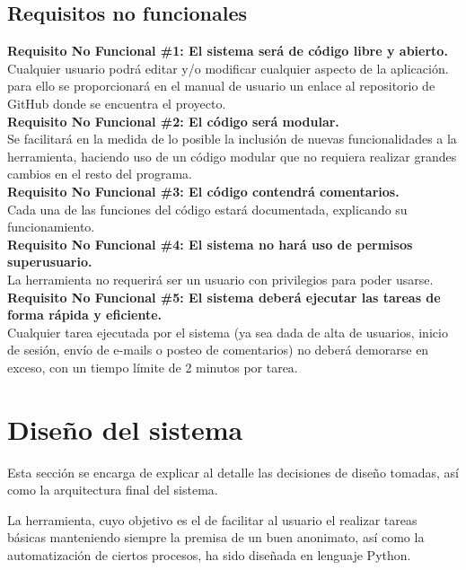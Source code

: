 \subsection{Requisitos no funcionales}
\begin{adjustwidth}{0.5cm}{}
	\textbf{Requisito No Funcional \#1: El sistema será de código libre y abierto.}\\
	Cualquier usuario podrá editar y/o modificar cualquier aspecto de la aplicación. para ello se proporcionará en el manual de usuario un enlace al repositorio de GitHub donde se encuentra el proyecto. \\
	\linebreak		
	\textbf{Requisito No Funcional \#2: El código será modular.}\\
	Se facilitará en la medida de lo posible la inclusión de nuevas funcionalidades a la herramienta, haciendo uso de un código modular que no requiera realizar grandes cambios en el resto del programa. \\
	\linebreak		
	\textbf{Requisito No Funcional \#3: El código contendrá comentarios.}\\
	Cada una de las funciones del código estará documentada, explicando su funcionamiento. \\	
	\linebreak			
	\textbf{Requisito No Funcional \#4: El sistema no hará uso de permisos superusuario.}\\
	La herramienta no requerirá ser un usuario con privilegios para poder usarse. \\	
	\linebreak
	\textbf{Requisito No Funcional \#5: El sistema deberá ejecutar las tareas de forma rápida y eficiente.}\\
	Cualquier tarea ejecutada por el sistema (ya sea dada de alta de usuarios, inicio de sesión, envío de e-mails o posteo de comentarios) no deberá demorarse en exceso, con un tiempo límite de 2 minutos por tarea. \\		
\end{adjustwidth}
\newpage
\section{Diseño del sistema}

Esta sección se encarga de explicar al detalle las decisiones de diseño tomadas, así como la arquitectura final del sistema. 

La herramienta, cuyo objetivo es el de facilitar al usuario el realizar tareas básicas manteniendo siempre la premisa de un buen anonimato, así como la automatización de ciertos procesos, ha sido diseñada en lenguaje Python. 

